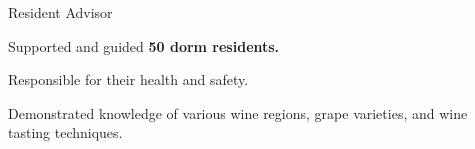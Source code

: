 {
  {Resident Advisor} \hfill{}\newline
}
{
  \item{Supported and guided \textbf{50 dorm residents.}}
  \item{Responsible for their health and safety.}
}

{
}
{\item{Demonstrated knowledge of various wine regions, grape varieties, and wine tasting techniques.}}



